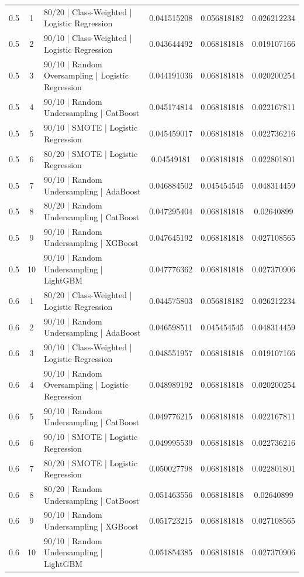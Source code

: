 \documentclass{article}
\begin{document}
\begin{longtable}{c c p{4cm} c c c}
0.5 & 1 & 80/20 | Class-Weighted | Logistic Regression & 0.041515208 & 0.056818182 & 0.026212234 \\
0.5 & 2 & 90/10 | Class-Weighted | Logistic Regression & 0.043644492 & 0.068181818 & 0.019107166 \\
0.5 & 3 & 90/10 | Random Oversampling | Logistic Regression & 0.044191036 & 0.068181818 & 0.020200254 \\
0.5 & 4 & 90/10 | Random Undersampling | CatBoost & 0.045174814 & 0.068181818 & 0.022167811 \\
0.5 & 5 & 90/10 | SMOTE | Logistic Regression & 0.045459017 & 0.068181818 & 0.022736216 \\
0.5 & 6 & 80/20 | SMOTE | Logistic Regression & 0.04549181 & 0.068181818 & 0.022801801 \\
0.5 & 7 & 90/10 | Random Undersampling | AdaBoost & 0.046884502 & 0.045454545 & 0.048314459 \\
0.5 & 8 & 80/20 | Random Undersampling | CatBoost & 0.047295404 & 0.068181818 & 0.02640899 \\
0.5 & 9 & 90/10 | Random Undersampling | XGBoost & 0.047645192 & 0.068181818 & 0.027108565 \\
0.5 & 10 & 90/10 | Random Undersampling | LightGBM & 0.047776362 & 0.068181818 & 0.027370906 \\
0.6 & 1 & 80/20 | Class-Weighted | Logistic Regression & 0.044575803 & 0.056818182 & 0.026212234 \\
0.6 & 2 & 90/10 | Random Undersampling | AdaBoost & 0.046598511 & 0.045454545 & 0.048314459 \\
0.6 & 3 & 90/10 | Class-Weighted | Logistic Regression & 0.048551957 & 0.068181818 & 0.019107166 \\
0.6 & 4 & 90/10 | Random Oversampling | Logistic Regression & 0.048989192 & 0.068181818 & 0.020200254 \\
0.6 & 5 & 90/10 | Random Undersampling | CatBoost & 0.049776215 & 0.068181818 & 0.022167811 \\
0.6 & 6 & 90/10 | SMOTE | Logistic Regression & 0.049995539 & 0.068181818 & 0.022736216 \\
0.6 & 7 & 80/20 | SMOTE | Logistic Regression & 0.050027798 & 0.068181818 & 0.022801801 \\
0.6 & 8 & 80/20 | Random Undersampling | CatBoost & 0.051463556 & 0.068181818 & 0.02640899 \\
0.6 & 9 & 90/10 | Random Undersampling | XGBoost & 0.051723215 & 0.068181818 & 0.027108565 \\
0.6 & 10 & 90/10 | Random Undersampling | LightGBM & 0.051854385 & 0.068181818 & 0.027370906 \\

\end{longtable}
\end{document}

